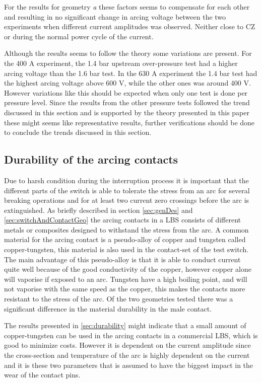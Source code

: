 \documentclass[10pt,a4paper]{article}
\begin{document}
For the results for geometry \textit{a} these factors seems to compensate for each other and resulting in no significant change in arcing voltage between the two experiments when different current amplitudes was observed. Neither close to CZ or during the normal power cycle of the current. 

Although the results seems to follow the theory some variations are present. For the 400 A experiment, the 1.4 bar upstream over-pressure test had a higher arcing voltage than the 1.6 bar test. In the 630 A experiment the 1.4 bar test had the highest arcing voltage above 600 V, while the other ones was around 400 V. However variations like this should be expected when only one test is done per pressure level. Since the results from the other pressure tests followed the trend discussed in this section and is supported by the theory presented in this paper these might seems like representative results, further verifications should be done to conclude the trends discussed in this section.

\subsection{Durability of the arcing contacts} \label{fig:durability}

Due to harsh condition during the interruption process it is important that the different parts of the switch is able to tolerate the stress from an arc for several breaking operations and for at least two current zero crossings before the arc is extinguished. As briefly described in section \ref{sec:genDes} and \ref{sec:switchAndContactGeo} the arcing contacts in a LBS consists of different metals or composites designed to withstand the stress from the arc. A common material for the arcing contact is a pseudo-alloy of copper and tungsten called copper-tungsten, this material is also used in the contact-set of the test switch. The main advantage of this pseudo-alloy is that it is able to conduct current quite well because of the good conductivity of the copper, however copper alone will vaporise if exposed to an arc. Tungsten have a high boiling point, and will not vaporise with the same speed as the copper, this makes the contacts more resistant to the stress of the arc. Of the two geometries tested there was a significant difference in the material durability in the male contact.

The results presented in \ref{sec:durability} might indicate that a small amount of copper-tungsten can be used in the arcing contacts in a commercial LBS, which is good to minimize costs. However it is dependent on the current amplitude since the cross-section and temperature of the arc is highly dependent on the current and it is these two parameters that is assumed to have the biggest impact in the wear of the contact pins. 
\end{document}
